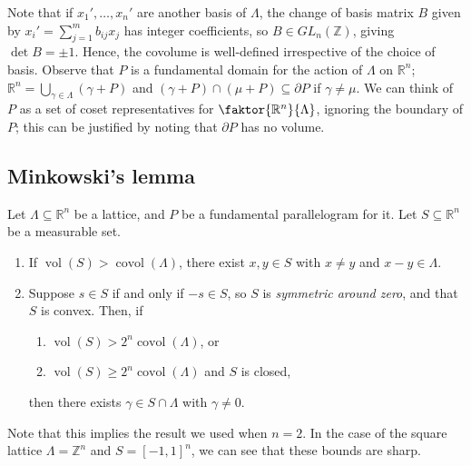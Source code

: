 Note that if \( x_1', \dots, x_n' \) are another basis of \( \Lambda \), the change of basis matrix \( B \) given by \( x_i' = \sum_{j=1}^m b_{ij} x_j \) has integer coefficients, so \( B \in GL_n(\mathbb Z) \), giving \( \det B = \pm 1 \).
Hence, the covolume is well-defined irrespective of the choice of basis.
Observe that \( P \) is a fundamental domain for the action of \( \Lambda \) on \( \mathbb R^n \); \( \mathbb R^n = \bigcup_{\gamma \in \Lambda} (\gamma + P) \) and \( (\gamma + P) \cap (\mu + P) \subseteq \partial P \) if \( \gamma \neq \mu \).
We can think of \( P \) as a set of coset representatives for \( \faktor{\mathbb R^n}{\Lambda} \), ignoring the boundary of \( P \); this can be justified by noting that \( \partial P \) has no volume.

\subsection{Minkowski's lemma}
\begin{theorem}
    Let \( \Lambda \subseteq \mathbb R^n \) be a lattice, and \( P \) be a fundamental parallelogram for it.
    Let \( S \subseteq \mathbb R^n \) be a measurable set.
    \begin{enumerate}
        \item If \( \operatorname{vol}(S) > \operatorname{covol}(\Lambda) \), there exist \( x, y \in S \) with \( x \neq y \) and \( x - y \in \Lambda \).
        \item Suppose \( s \in S \) if and only if \( -s \in S \), so \( S \) is \emph{symmetric around zero}, and that \( S \) is convex.
        Then, if
        \begin{enumerate}
            \item \( \operatorname{vol}(S) > 2^n \operatorname{covol}(\Lambda) \), or
            \item \( \operatorname{vol}(S) \geq 2^n \operatorname{covol}(\Lambda) \) and \( S \) is closed, 
        \end{enumerate}
        then there exists \( \gamma \in S \cap \Lambda \) with \( \gamma \neq 0 \).
    \end{enumerate}
\end{theorem}
Note that this implies the result we used when \( n = 2 \).
In the case of the square lattice \( \Lambda = \mathbb Z^n \) and \( S = [-1,1]^n \), we can see that these bounds are sharp.
